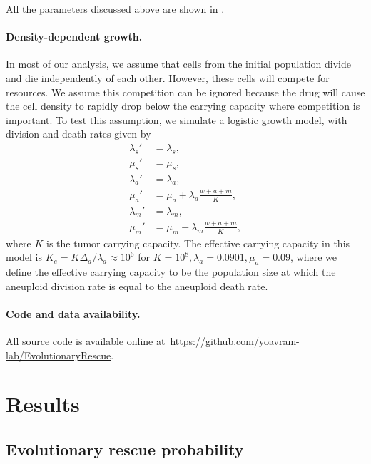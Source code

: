 \documentclass[12pt]{extarticle}
\begin{document}
All the parameters discussed above are shown in .



\paragraph{Density-dependent growth.}

In most of our analysis, we assume that cells from the initial population divide and die independently of each other. 
However, these cells will compete for resources. 
We assume this competition can be ignored because the drug will cause the cell density to rapidly drop below the carrying capacity where competition is important.
To test this assumption, we simulate a logistic growth model, with division and death rates given by
\[
\begin{aligned}
\lambda_s' &= \lambda_s , \\
\mu_s' &= \mu_s ,\\
\lambda_a' &= \lambda_a ,\\ 
\mu_a' &= \mu_a + \lambda_a\frac{w+a+m}{K} ,\\
\lambda_m' &= \lambda_m ,\\ 
\mu_m' &= \mu_m + \lambda_m\frac{w+a+m}{K} ,
\end{aligned}
\]
where $K$ is the tumor carrying capacity. 
The effective carrying capacity in this model is $K_e=K\Delta_a/\lambda_a\approx10^6$ for $K=10^8, \lambda_a=0.0901,\mu_a=0.09$, where we define the effective carrying capacity to be the population size at which the aneuploid division rate is equal to the aneuploid death rate. 


\paragraph{Code and data availability.} All source code is available online at~\url{https://github.com/yoavram-lab/EvolutionaryRescue}.


\section*{Results}


\subsection*{Evolutionary rescue probability}
\end{document}
